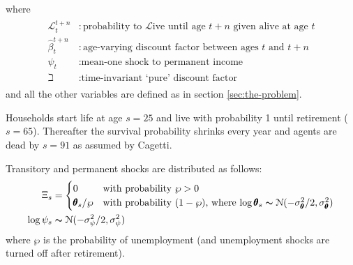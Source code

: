 \documentclass[titlepage, headings=optiontotocandhead]{Resources/texmf-local/tex/latex/econtex}
\begin{document}
where
  \begin{equation*}\begin{gathered}\begin{aligned}
        \mathcal{L} _{t}^{t+n} &:\text{probability to }\mathcal{L}\text{ive until age $t+n$ given alive at age $t$}
        \\      \hat{\beta}_{t}^{t+n} &:\text{age-varying discount factor between ages $t$ and $t+n$}
        \\     \psi_{t} &:\text{mean-one shock to permanent income}
        \\     \beth &:\text{time-invariant `pure' discount factor}
      \end{aligned}\end{gathered}\end{equation*}
and all the other variables are defined as in section \ref{sec:the-problem}.

Households start life at age $s=25$ and live with probability 1 until retirement
($s=65$). Thereafter the survival probability shrinks every year and
agents are dead by $s=91$ as assumed by Cagetti. %

  Transitory and permanent shocks are distributed as follows:
  \begin{equation}\begin{gathered}\begin{aligned}
        \Xi_{s} & =
        \begin{cases}
          0\phantom{/\wp} & \text{with probability $\wp>0$} \\
          \pmb{\theta}_{s}/\wp      & \text{with probability $(1-\wp)$, where $\log \pmb{\theta}_{s}\thicksim \mathcal{N}(-\sigma_{\pmb{\theta}}^{2}/2,\sigma_{\pmb{\theta}}^{2})$}\\
        \end{cases}\\
        \log \psi_{s} &\thicksim \mathcal{N}(-\sigma_{\psi}^{2}/2,\sigma_{\psi}^{2})
      \end{aligned}\end{gathered}\end{equation}
  where $\wp$ is the probability of unemployment (and unemployment shocks are turned off after retirement).
\end{document}
